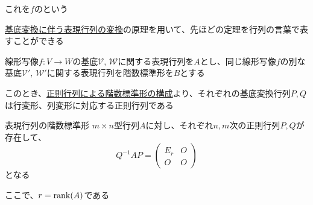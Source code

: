 \documentclass[../../../topic_linear-algebra]{subfiles}
\begin{document}
これを$f$のという

\sectionline

\hyperref[thm:change-of-representation-matrix]{基底変換に伴う表現行列の変換}の原理を用いて、先ほどの定理を行列の言葉で表すことができる

\br

線形写像$f\colon V \to W$の基底$\mathcal{V},\, \mathcal{W}$に関する表現行列を$A$とし、同じ線形写像$f$の別な基底$\mathcal{V}',\, \mathcal{W}'$に関する表現行列を階数標準形を$B$とする

このとき、\hyperref[thm:rank-normal-form-by-regular-matrices]{正則行列による階数標準形の構成}より、それぞれの基底変換行列$P,Q$は行変形、列変形に対応する正則行列である

\begin{theorem*}{表現行列の階数標準形}
  $m\times n$型行列$A$に対し、それぞれ$n,m$次の正則行列$P,Q$が存在して、
  \begin{equation*}
    Q^{-1} A P = \begin{pmatrix}
      E_r & O \\
      O   & O
    \end{pmatrix}
  \end{equation*}
  となる

  ここで、$r = \rank(A)$である
\end{theorem*}
\end{document}

